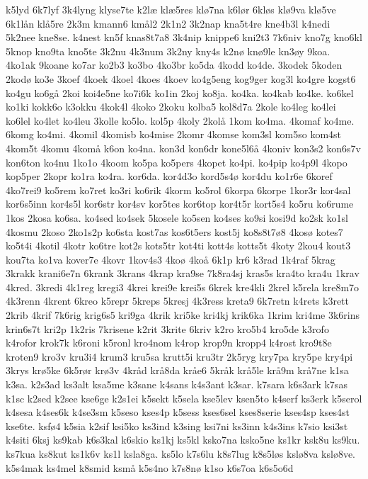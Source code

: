 {k5lyd
6k7lyf
3k4lyng
klyse7te
k2læ
klæ5res
klø7na
k6lør
6kløs
klø9va
klø5ve
6k1lån
klå5re
2k3m
kmann6
kmål2
2k1n2
3k2nap
kna5t4re
kne4b3l
k4nedi
5k2nee
kne8se.
k4nest
kn5f
knas8t7a8
3k4nip
knippe6
kni2t3
7k6niv
kno7g
kno6kl
5knop
kno9ta
kno5te
3k2nu
4k3num
3k2ny
kny4s
k2nø
knø9le
kn3øy
9koa.
4ko1ak
9koane
ko7ar
ko2b3
ko3bo
4ko3br
ko5da
4kodd
ko4de.
3kodek
5koden
2kodø
ko3e
3koef
4koek
4koel
4koes
4koev
ko4g5eng
kog9ger
kog3l
ko4gre
kogst6
ko4gu
ko6gå
2koi
koi4e5ne
ko7i6k
ko1in
2koj
ko8ja.
ko4ka.
ko4kab
ko4ke.
ko6kel
ko1ki
kokk6o
k3okku
4kok4l
4koko
2koku
kolba5
kol8d7a
2kole
ko4leg
ko4lei
ko6lel
ko4let
ko4leu
3kolle
ko5lo.
kol5p
4koly
2kolå
1kom
ko4ma.
4komaf
ko4me.
6komg
ko4mi.
4komil
4komisb
ko4mise
2komr
4komse
kom3sl
kom5so
kom4st
4kom5t
4komu
4komå
k6on
ko4na.
kon3d
kon6dr
kone5l6å
4koniv
kon3s2
kon6s7v
kon6ton
ko4nu
1ko1o
4koom
ko5pa
ko5pers
4kopet
ko4pi.
ko4pip
ko4p9l
4kopo
kop5per
2kopr
ko1ra
ko4ra.
kor6da.
kor4d3o
kord5s4ø
kor4du
ko1r6e
6koref
4ko7rei9
ko5rem
ko7ret
ko3ri
ko6rik
4korm
ko5rol
6korpa
6korpe
1kor3r
kor4sal
kor6s5inn
kor4s5l
kor6str
kor4sv
kor5tes
kor6top
kor4t5r
kort5s4
ko5ru
ko6rume
1kos
2kosa
ko6sa.
ko4sed
ko4sek
5kosele
ko5sen
ko4ses
ko9si
kosi9d
ko2sk
ko1sl
4kosmu
2koso
2ko1s2p
ko6sta
kost7as
kos6t5ers
kost5j
ko8s8t7ø8
4kosø
kotes7
ko5t4i
4kotil
4kotr
ko6tre
kot2s
kots5tr
kot4ti
kott4s
kotts5t
4koty
2kou4
kout3
kou7ta
ko1va
kover7e
4kovr
1kov4s3
4koø
4koå
6k1p
kr6
k3rad
1k4raf
5krag
3krakk
krani6e7n
6krank
3krans
4krap
kra9se
7k8ra4sj
kras5s
kra4to
kra4u
1krav
4kred.
3kredi
4k1reg
kregi3
4krei
krei9e
krei5s
6krek
kre4kli
2krel
k5rela
kre8m7o
4k3renn
4krent
6kreo
k5repr
5kreps
5kresj
4k3ress
kreta9
6k7retn
k4rets
k3rett
2krib
4krif
7k6rig
krig6s5
kri9ga
4krik
kri5ke
kri4kj
krik6ka
1krim
kri4me
3k6rins
krin6s7t
kri2p
1k2ris
7krisene
k2rit
3krite
6kriv
k2ro
kro5b4
kro5de
k3rofo
k4rofor
krok7k
k6roni
k5ronl
kro4nom
k4rop
krop9n
kropp4
k4rost
kro9t8e
kroten9
kro3v
kru3i4
krum3
kru5sa
krutt5i
kru3tr
2k5ryg
kry7pa
kry5pe
kry4pi
3krys
krø5ke
6k5rør
krø3v
4kråd
krå8da
kråe6
5kråk
krå5le
krå9m
krå7ne
k1sa
k3sa.
k2s3ad
ks3alt
ksa5me
k3sane
k4sans
k4s3ant
k3sar.
k7sara
k6s3ark
k7sas
k1sc
k2sed
k2see
kse6ge
k2s1ei
k5sekt
k5sela
kse5lev
ksen5to
k4serf
ks3erk
k5serol
k4sesa
k4ses6k
k4se3sm
k5seso
kses4p
k5sess
kses6sel
kses8serie
kses4sp
kses4st
kse6te.
ksfø4
k5sia
k2sif
ksi5ko
ks3ind
k3sing
ksi7ni
ks3inn
k4s3ins
k7sio
ksi3st
k4siti
6ksj
ks9kab
k6s3kal
k6skio
ks1kj
ks5kl
ksko7na
ksko5ne
ks1kr
ksk8u
ks9ku.
ks7kua
ks8kut
ks1k6v
ks1l
ksla8ga.
ks5lo
k7s6lu
k8s7lug
k8s5løs
kslø8va
kslø8ve.
k5s4mak
ks4mel
k8smid
ksmå
k5s4no
k7s8nø
k1so
k6s7oa
k6s5o6d
}
